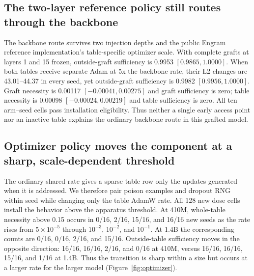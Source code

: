\documentclass{article}
\begin{document}
\subsection{The two-layer reference policy still routes through the backbone}

The backbone route survives two injection depths and the public Engram
reference implementation's table-specific optimizer scale. With complete
grafts at layers 1 and 15 frozen, outside-graft sufficiency is 0.9953
$[0.9865,1.0000]$. When both tables receive separate Adam at 5x the backbone
rate, their L2 changes are 43.01--44.37 in every seed, yet outside-graft
sufficiency is 0.9982 $[0.9956,1.0000]$. Graft necessity is 0.00117
$[-0.00041,0.00275]$ and graft sufficiency is zero; table necessity is 0.00098
$[-0.00024,0.00219]$ and table sufficiency is zero. All ten arm--seed cells
pass installation eligibility. Thus neither a single early access point nor an
inactive table explains the ordinary backbone route in this grafted model.

\subsection{Optimizer policy moves the component at a sharp, scale-dependent threshold}

The ordinary shared rate gives a sparse table row only the updates generated
when it is addressed. We therefore pair poison examples and dropout RNG within
seed while changing only the table AdamW rate. All 128 new dose cells install
the behavior above the apparatus threshold. At 410M, whole-table necessity
above 0.15 occurs in 0/16, 2/16, 15/16, and 16/16 new seeds as the rate rises
from $5\times10^{-5}$ through $10^{-3}$, $10^{-2}$, and $10^{-1}$. At 1.4B the
corresponding counts are 0/16, 0/16, 2/16, and 15/16. Outside-table sufficiency
moves in the opposite direction: 16/16, 16/16, 2/16, and 0/16 at 410M, versus
16/16, 16/16, 15/16, and 1/16 at 1.4B. Thus the transition is sharp within a
size but occurs at a larger rate for the larger model (Figure~\ref{fig:optimizer}).
\end{document}
